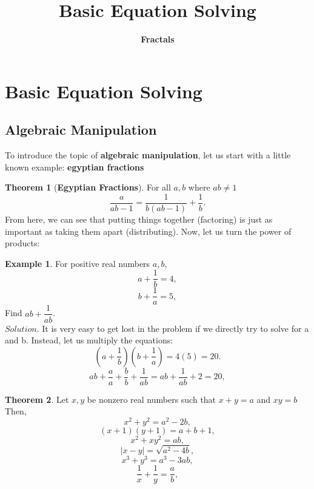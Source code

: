 \documentclass[a4paper]{article}
\theoremstyle{definition}
\newtheorem{exmp}{Example}[section]
\newtheorem{theorem}{Theorem}
\begin{document}
\author{ \textbf{Fractals}}
\title{\textbf{Basic Equation Solving}}
\maketitle
\tableofcontents
\noindent
\section{Basic Equation Solving}
\subsection{Algebraic Manipulation}
To introduce the topic of \textbf{algebraic manipulation},
let us start with a little known example: \textbf{egyptian fractions}

\begin{theorem}[\textbf{Egyptian Fractions}]
    For all \(a, b \) where \(ab \ne 1 \)
    \[
        \dfrac{a}{ab - 1 } = \dfrac{1}{b( ab - 1)} + \dfrac{1}{b}.
    \]
    From here, we can see that putting things together (factoring) is just as important as taking them
    apart (distributing). Now, let us turn the power of products:
\end{theorem}
\begin{exmp}
    For positive real numbers \(a, b \),
    \[
        a + \dfrac{1}{b} = 4,
    \]
    \[
        b + \dfrac{1}{a} = 5,
    \]
    Find \(ab + \dfrac{1}{ab} \). \\

    \noindent
    \(Solution\). It is very easy to get lost in the problem if we directly try to solve for a and b. Instead,
    let us multiply the equations:
    \[
        (a+\dfrac{1}{b})(b+\dfrac{1}{a}) = 4(5) = 20.
    \]
    \[
        ab + \dfrac{a}{a} + \dfrac{b}{b} + \dfrac{1}{ab} = ab + \dfrac{1}{ab} + 2 = 20,
    \]
    \begin{center}
    \end{center}
\end{exmp}
\begin{theorem}
    Let \(x, y \) be nonzero real numbers such that \(x + y = a\) and \(xy = b\) Then,
    \[
        x^2 + y^2 = a^2 -2b,
    \]
    \[
        (x+1)(y+1) = a + b + 1,
    \]
    \[
        x^2 + xy^2 = ab,
    \]
    \[
        | x - y | = \sqrt{a^2 - 4b},
    \]
    \[
        x^3 + y^3 = a^3 - 3ab,
    \]
    \[
        \dfrac{1}{x} + \dfrac{1}{y} = \dfrac{a}{b},
    \]
\end{theorem}
\end{document}
